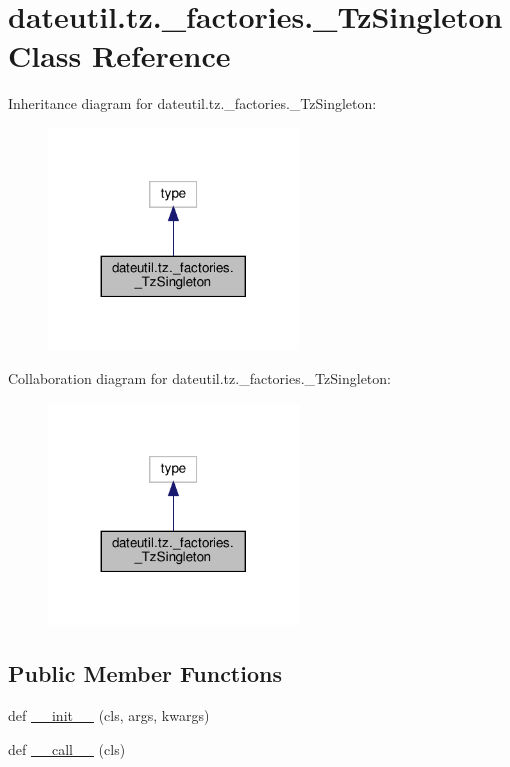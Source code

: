 \hypertarget{classdateutil_1_1tz_1_1__factories_1_1__TzSingleton}{}\section{dateutil.\+tz.\+\_\+factories.\+\_\+\+Tz\+Singleton Class Reference}
\label{classdateutil_1_1tz_1_1__factories_1_1__TzSingleton}


Inheritance diagram for dateutil.\+tz.\+\_\+factories.\+\_\+\+Tz\+Singleton\+:
\nopagebreak
\begin{figure}[H]
\begin{center}
\leavevmode
\includegraphics[width=188pt]{classdateutil_1_1tz_1_1__factories_1_1__TzSingleton__inherit__graph}
\end{center}
\end{figure}


Collaboration diagram for dateutil.\+tz.\+\_\+factories.\+\_\+\+Tz\+Singleton\+:
\nopagebreak
\begin{figure}[H]
\begin{center}
\leavevmode
\includegraphics[width=188pt]{classdateutil_1_1tz_1_1__factories_1_1__TzSingleton__coll__graph}
\end{center}
\end{figure}
\subsection*{Public Member Functions}
\begin{DoxyCompactItemize}
\item 
def \hyperlink{classdateutil_1_1tz_1_1__factories_1_1__TzSingleton_afd5b53275532047a3fb328d8f381c8cd}{\+\_\+\+\_\+init\+\_\+\+\_\+} (cls, args, kwargs)
\item 
def \hyperlink{classdateutil_1_1tz_1_1__factories_1_1__TzSingleton_a56ac7993f56f5358151605a3f99cc41d}{\+\_\+\+\_\+call\+\_\+\+\_\+} (cls)
\end{DoxyCompactItemize}


